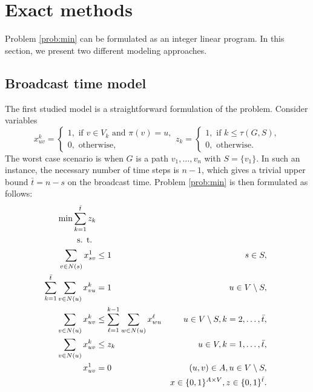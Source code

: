\section{Exact methods}

Problem \ref{prob:min} can be formulated as an integer linear program. %
In this section, we present two different modeling approaches. 

\subsection{Broadcast time model}
The first studied model is a straightforward formulation of the problem.
Consider variables 
$$ x_{uv}^k=
\begin{cases} 
1, \text{ if } v\in V_k \text{ and } \pi(v)=u,\\ 
0, \text{ otherwise},
\end{cases}
z_{k}=\begin{cases}
1, \text{ if } k\leq\tau(G,S),\\
0, \text{ otherwise}.
\end{cases}
$$
The worst case scenario is when $G$ is a path $v_1,\dots,v_n$ with $S=\{v_1\}$. 
In such an instance, the necessary number of time steps is $n-1$, which gives a trivial upper bound $\bar{t}=n-s$ on the broadcast time.
Problem \ref{prob:min} is then formulated as follows: 
\begin{subequations}\label{mod:basic}
\begin{align}
\label{mod:basic:obj} \min \sum\limits_{k=1}^{\bar{t}}z_k \\ 
\notag \text{s. t. } \\
\label{mod:basic:onefromroot} \sum_{v \in N(s)}x^1_{sv} & \leq 1 & s\in S,\\
\label{mod:basic:singlein} \sum\limits_{k=1}^{\bar{t}}\sum\limits_{v\in N(u)}x_{vu}^k & = 1 & u\in V \setminus S,\\
\label{mod:basic:tIncreases} \sum\limits_{v\in N(u)}x_{uv}^k &\leq\sum\limits_{\ell=1}^{k-1}\sum\limits_{w\in N(u)} x_{wu}^{\ell}  & u\in V\setminus S, k=2,\dots,\bar{t},\\
\label{mod:basic:tcrel} \sum\limits_{v\in N(u)}x_{uv}^k & \leq z_k &  u\in V,k=1,\dots,\bar{t},\\
\label{mod:basic:positiveCost}x_{uv}^1 & = 0 & (u,v)\in A, u \in V\setminus S,\\
\label{mod:basic:dim}&&x \in \{0,1\}^{A\times V},z\in\{0,1\}^{\bar{t}}.
\end{align}~
\end{subequations}
